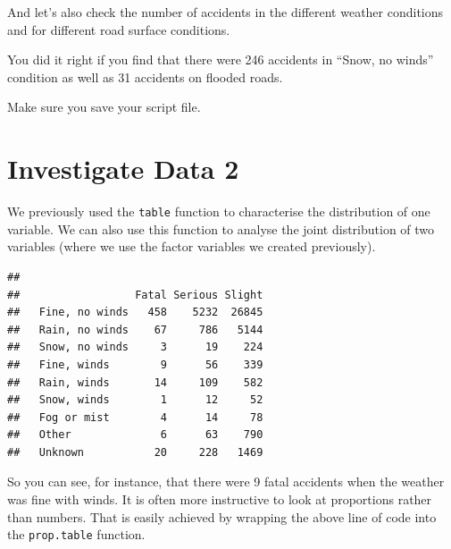 \documentclass[
]{article}
\newenvironment{Shaded}{\begin{snugshade}}{\end{snugshade}}
\newcommand{\FunctionTok}[1]{\textcolor[rgb]{0.13,0.29,0.53}{\textbf{#1}}}
\newcommand{\NormalTok}[1]{#1}
\newcommand{\SpecialCharTok}[1]{\textcolor[rgb]{0.81,0.36,0.00}{\textbf{#1}}}
\begin{document}
And let's also check the number of accidents in the different weather
conditions and for different road surface conditions.

You did it right if you find that there were 246 accidents in ``Snow, no
winds'' condition as well as 31 accidents on flooded roads.

Make sure you save your script file.

\hypertarget{investigate-data-2}{%
\section{Investigate Data 2}\label{investigate-data-2}}

We previously used the \texttt{table} function to characterise the
distribution of one variable. We can also use this function to analyse
the joint distribution of two variables (where we use the factor
variables we created previously).

\begin{Shaded}
\end{Shaded}

\begin{verbatim}
##                 
##                  Fatal Serious Slight
##   Fine, no winds   458    5232  26845
##   Rain, no winds    67     786   5144
##   Snow, no winds     3      19    224
##   Fine, winds        9      56    339
##   Rain, winds       14     109    582
##   Snow, winds        1      12     52
##   Fog or mist        4      14     78
##   Other              6      63    790
##   Unknown           20     228   1469
\end{verbatim}

So you can see, for instance, that there were 9 fatal accidents when the
weather was fine with winds. It is often more instructive to look at
proportions rather than numbers. That is easily achieved by wrapping the
above line of code into the \texttt{prop.table} function.

\begin{Shaded}
\end{Shaded}
\end{document}
